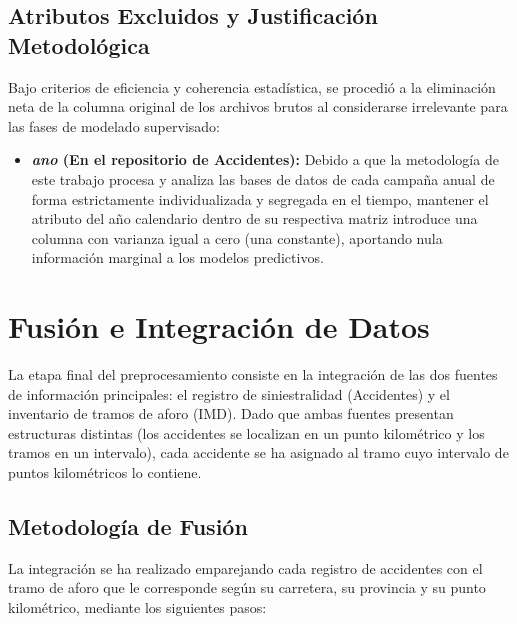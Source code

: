 \documentclass[twoside,a4paper,12pt,onecolumn,openany]{book}
\begin{document}
\subsection{Atributos Excluidos y Justificación Metodológica}

Bajo criterios de eficiencia y coherencia estadística, se procedió a la eliminación neta de la columna original de los archivos brutos al considerarse irrelevante para las fases de modelado supervisado:

\begin{itemize}
    \item \textbf{\textit{ano} (En el repositorio de Accidentes):} Debido a que la metodología de este trabajo procesa y analiza las bases de datos de cada campaña anual de forma estrictamente individualizada y segregada en el tiempo, mantener el atributo del año calendario dentro de su respectiva matriz introduce una columna con varianza igual a cero (una constante), aportando nula información marginal a los modelos predictivos.
\end{itemize}

\section{Fusión e Integración de Datos}

La etapa final del preprocesamiento consiste en la integración de las dos fuentes de información principales: el registro de siniestralidad (Accidentes) y el inventario de tramos de aforo (IMD). Dado que ambas fuentes presentan estructuras distintas (los accidentes se localizan en un punto kilométrico y los tramos en un intervalo), cada accidente se ha asignado al tramo cuyo intervalo de puntos kilométricos lo contiene.

\subsection{Metodología de Fusión}

La integración se ha realizado emparejando cada registro de accidentes con el tramo de aforo que le corresponde según su carretera, su provincia y su punto kilométrico, mediante los siguientes pasos:
\end{document}
